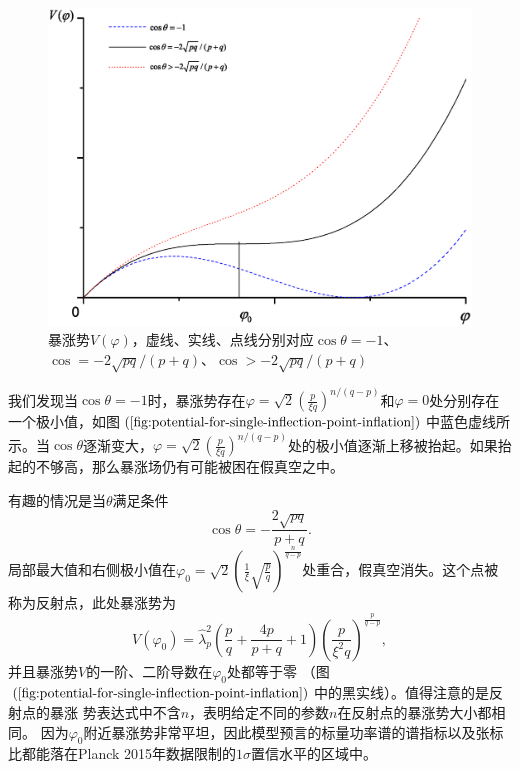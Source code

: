 \begin{figure}
  \centering
  \includegraphics[width=5in]{Img/Graph1.eps}
  \caption{暴涨势$V(\varphi)$，虚线、实线、点线分别对应$\cos\theta=-1$、$\cos=-2\sqrt{pq}/(p+q)$、$\cos>-2\sqrt{pq}/(p+q)$}\label{fig:potential-for-single-inflection-point-inflation}
\end{figure}

我们发现当$\cos\theta =
-1$时，暴涨势存在$\varphi=\sqrt{2}{\left(\frac{p}{\xi
      q}\right)}^{n/(q-p)}$和$\varphi=0$处分别存在一个极小值，如图$(\ref{fig:potential-for-single-inflection-point-inflation})$中蓝色虚线所示。当$\cos\theta$逐渐变大，$\varphi=\sqrt{2}{\left(\frac{p}{\xi
q}\right)}^{n/(q-p)}$处的极小值逐渐上移被抬起。如果抬起的不够高，那么暴涨场仍有可能被困在假真空之中。

有趣的情况是当$\theta$满足条件
\begin{equation}
  \label{eq:inflection-point-condition}
  \cos\theta = - \frac{2\sqrt{pq}}{p+q}. 
\end{equation}
局部最大值和右侧极小值在$\varphi_0=\sqrt{2}{\left(\frac{1}{\xi}\sqrt{\frac{p}{q}}\right)}^{\frac{n}{q-p}}$处重合，假真空消失。这个点被称为反射点，此处暴涨势为
\begin{equation}
  V(\varphi_0) = \hat{\lambda}^2_{p} \left( \frac{p}{q}+\frac{4p}{p+q}+1\right)
  {\left(\frac{p}{\xi^2 q}\right)}^{\frac{p}{q-p}},
\end{equation}
并且暴涨势$V$的一阶、二阶导数在$\varphi_0$处都等于零
（图$(\ref{fig:potential-for-single-inflection-point-inflation})$中的黑实线）。值得注意的是反射点的暴涨
势表达式中不含$n$，表明给定不同的参数$n$在反射点的暴涨势大小都相同。
因为$\varphi_0$附近暴涨势非常平坦，因此模型预言的标量功率谱的谱指标以及张标比都能落在Planck
2015年数据限制的$1\sigma$置信水平的区域中。

